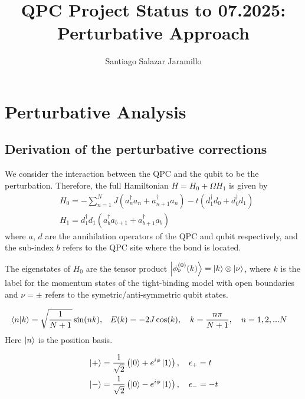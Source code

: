 \documentclass{article}
\title{QPC Project Status to 07.2025: Perturbative Approach}
\author{Santiago Salazar Jaramillo}
\date{}
\begin{document}
\maketitle

\section{Perturbative Analysis}

\subsection{Derivation of the perturbative corrections}

We consider the interaction between the QPC and the qubit to be the perturbation. Therefore, the full Hamiltonian $H = H_0 + \Omega H_1$ is given by
\begin{align}
    & H_0 = -\sum_{n=1}^{N}J(a_{n}^{\dagger} a_{n} + a_{n+1}^{\dagger}a_{n} ) - t(d_{1}^{\dagger}d_{0}+d_{0}^{\dagger}d_{1}) \\
    & H_1 = d_{1}^{\dagger}d_{1}( a_{b}^{\dagger}a_{b+1} + a^{\dagger}_{b+1}a_{b} )
\end{align}
where $a$, $d$ are the annihilation operators of the QPC and qubit respectively, and the sub-index $b$ refers to the QPC site where the bond is located. 

The eigenstates of $H_0$ are the tensor product $\ket{\phi^{(0)}_\nu (k)} = \ket{k}\otimes \ket{\nu}$, where $k$ is the label for the momentum states of the tight-binding model with open boundaries and $\nu = \pm$ refers to the symetric/anti-symmetric qubit states. 

\begin{tcolorbox}[title=QPC eigenstates, colback=white, colframe=black]
\begin{align}
    \bra{n}\ket{k} = \sqrt{\frac{1}{N+1}} \sin(n k) ,\quad & E(k) = -2J\cos(k), \quad k = \frac{n\pi}{N+1},\quad n= 1, 2,...N
\end{align}
Here $\ket{n}$ is the position basis.
\end{tcolorbox}

\begin{tcolorbox}[title=Qubit eigenstates, colback=white, colframe=black]
\begin{align}
   & \ket{+} = \frac{1}{\sqrt{2}}\left( \ket{0} + e^{i\phi} \ket{1}\right), \quad \epsilon_+ = t \\
   & \ket{-} = \frac{1}{\sqrt{2}}\left( \ket{0} - e^{i\phi} \ket{1}\right), \quad \epsilon_- = -t
\end{align}
\end{tcolorbox}
\end{document}
